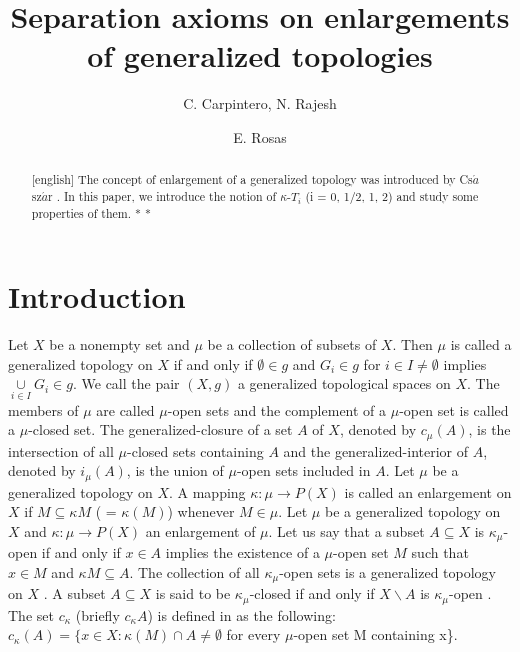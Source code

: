 \documentclass{matua}
\title{Separation axioms on enlargements of generalized topologies}
\author{C. Carpintero, N. Rajesh \and  E. Rosas}
\makeatletter
\let\oldfootnote\footnote
\def\footnote{\@ifstar\footnote@star\footnote@nostar}
\def\footnote@star#1{{\let\thefootnote\relax\footnotetext{#1}}}
\def\footnote@nostar{\oldfootnote}
\makeatother
\begin{document}
\maketitle
\begin{abstract}[english]
The concept of enlargement of a generalized topology was introduced by Cs$\acute{a}$sz$\acute{a}$r \cite{cs3}. In this paper, we introduce the  notion of $\kappa$-$T_i$ (i = 0, 1/2, 1, 2) and study some properties of them.
\footnote*{}
\footnote*{}
\end{abstract}



\section{Introduction}
Let $X$ be a nonempty set and $\mu$ be a collection of subsets of $X$. Then $\mu$ is called a generalized topology on $X$ if and only if  $\emptyset\in g$ and $G_i\in g$ for $i \in I\neq\emptyset$ implies $\mathop\cup\limits_{i\in I} G_i\in g$. We call the pair $(X, g)$ a generalized topological spaces on $X$. The members of $\mu$ are called $\mu$-open sets \cite{cs1} and the complement of a $\mu$-open set is called a $\mu$-closed  set. The generalized-closure of a set $A$ of $X$, denoted by $c_\mu(A)$, is the intersection of all $\mu$-closed sets containing $A$ and the generalized-interior of $A$, denoted by $i_\mu(A)$, is the union of $\mu$-open sets included in $A$.
Let $\mu$ be a generalized topology on $X$. A mapping $\kappa: \mu\rightarrow P(X)$ is called an enlargement \cite{cs3} on $X$ if $M\subseteq \kappa M$ ( = $\kappa(M)$) whenever $M\in\mu$.
Let $\mu$ be a generalized topology on $X$ and $\kappa: \mu\rightarrow P(X)$ an enlargement of $\mu$. Let us say that a subset $A\subseteq X$ is $\kappa_\mu$-open \cite{cs3} if and only if $x\in A$ implies the existence of a $\mu$-open set $M$ such that $x\in M$ and $\kappa M\subseteq A$.
The collection of all $\kappa_\mu$-open sets is a generalized topology on $X$  \cite{cs3}. A subset $A\subseteq X$ is said to be $\kappa_\mu$-closed if  and only if $X\backslash A$ is $\kappa_\mu$-open \cite{cs3}. The set $c_{\kappa}$ (briefly $c_\kappa A$) is defined in \cite{cs3} as the following:\newline
\hspace*{20pt}
{$c_{\kappa} (A) = \{x\in X: \kappa (M)\cap A\neq\emptyset$ for every $\mu$-open set M containing x\}}.
\end{document}
